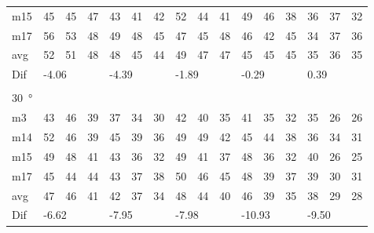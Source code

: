 \begin{table}[H]
\begin{tabular}{l|l|l|l|l|l|l|l|l|l|l|l|l|lll}
m15  &  45    & 45     &   47   &  43    &  41    &  42    & 52     &    44   &   41   &   49    &   46   &   38   & \multicolumn{1}{l|}{36} & \multicolumn{1}{l|}{37} & 32 \\
m17  &  56    & 53     &  48    &  49    & 48     &  45    &  47    &   45    &    48  &   46    &   42   & 45     & \multicolumn{1}{l|}{34} & \multicolumn{1}{l|}{37} & 36 \\ \hline
avg & 52     & 51     &  48    &  48    &  45    &  44    &  49    &   47    & 47     &    45   &   45   &  45    & \multicolumn{1}{l|}{35} & \multicolumn{1}{l|}{36}  & 35  \\ \hline  
Dif & \multicolumn{3}{l|}{-4.06} & \multicolumn{3}{l|}{-4.39} & \multicolumn{3}{l|}{-1.89} & \multicolumn{3}{l|}{-0.29} & \multicolumn{3}{l}{0.39} \\ 
 \multicolumn{16}{l}{ } \\                             
\SI{30}{\degree}   & \multicolumn{3}{l|}{} & \multicolumn{3}{l|}{} & \multicolumn{3}{l|}{} & \multicolumn{3}{l|}{} & \multicolumn{3}{l}{}   \\  \hline
m3    & 43     &  46    &  39    &  37    &  34    &  30    &  42    &   40    &   35   &   41    &  35    &   32   & \multicolumn{1}{l|}{35} & \multicolumn{1}{l|}{26} &26  \\
m14  & 52     &  46    &  39    &  45    &   39   &  36    &  49    &  49     &  42    &   45    &   44   &   38   & \multicolumn{1}{l|}{36} & \multicolumn{1}{l|}{34} & 31 \\
m15  &  49    &  48    &  41    &   43   &   36   &   32   &   49   &  41     & 37     &    48   &   36   &   32   & \multicolumn{1}{l|}{40} & \multicolumn{1}{l|}{26} & 25 \\
m17  & 45     &  44    &  44    &  43    &  37    &    38  &   50   &   46    &  45    &  48     &  39    &   37   & \multicolumn{1}{l|}{39} & \multicolumn{1}{l|}{30} &  31\\ \hline
avg &  47    & 46     &  41    &  42    &  37    &  34    &  48    &   44    &  40    &   46    &   39   &  35    & \multicolumn{1}{l|}{38} & \multicolumn{1}{l|}{29}  & 28 \\ \hline  
Dif & \multicolumn{3}{l|}{-6.62} & \multicolumn{3}{l|}{-7.95} & \multicolumn{3}{l|}{-7.98} & \multicolumn{3}{l|}{-10.93} & \multicolumn{3}{l}{-9.50}                                
\end{tabular}
\end{table}



